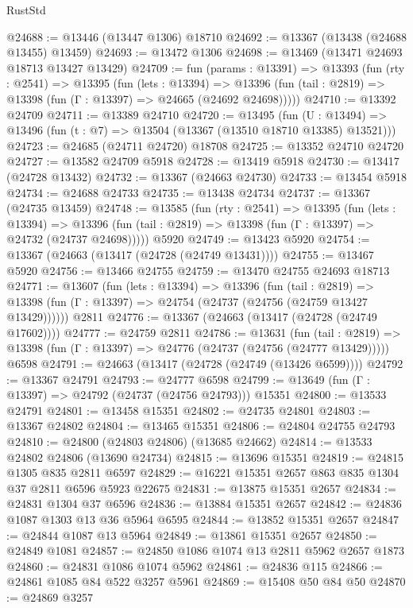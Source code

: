 \begin{lexlean}{RustStd}
\begin{coremodule}
@24688 := @13446 (@13447 @1306) @18710
@24692 := @13367 (@13438 (@24688 @13455) @13459)
@24693 := @13472 @1306
@24698 := @13469 (@13471 @24693 @18713 @13427 @13429)
@24709 := fun (params : @13391) =>
  @13393
    (fun (rty : @2541) =>
    @13395
      (fun (lets : @13394) =>
      @13396 (fun (tail : @2819) => @13398 (fun (Γ : @13397) => @24665 (@24692 @24698)))))
@24710 := @13392 @24709
@24711 := @13389 @24710
@24720 := @13495
    (fun (U : @13494) => @13496 (fun (t : @7) => @13504 (@13367 (@13510 @18710 @13385) @13521)))
@24723 := @24685 (@24711 @24720) @18708
@24725 := @13352 @24710 @24720
@24727 := @13582 @24709 @5918
@24728 := @13419 @5918
@24730 := @13417 (@24728 @13432)
@24732 := @13367 (@24663 @24730)
@24733 := @13454 @5918
@24734 := @24688 @24733
@24735 := @13438 @24734
@24737 := @13367 (@24735 @13459)
@24748 := @13585
    (fun (rty : @2541) =>
    @13395
      (fun (lets : @13394) =>
      @13396 (fun (tail : @2819) => @13398 (fun (Γ : @13397) => @24732 (@24737 @24698)))))
    @5920
@24749 := @13423 @5920
@24754 := @13367 (@24663 (@13417 (@24728 (@24749 @13431))))
@24755 := @13467 @5920
@24756 := @13466 @24755
@24759 := @13470 @24755 @24693 @18713
@24771 := @13607
    (fun (lets : @13394) =>
    @13396
      (fun (tail : @2819) =>
      @13398 (fun (Γ : @13397) => @24754 (@24737 (@24756 (@24759 @13427 @13429))))))
    @2811
@24776 := @13367 (@24663 (@13417 (@24728 (@24749 @17602))))
@24777 := @24759 @2811
@24786 := @13631
    (fun (tail : @2819) => @13398 (fun (Γ : @13397) => @24776 (@24737 (@24756 (@24777 @13429)))))
    @6598
@24791 := @24663 (@13417 (@24728 (@24749 (@13426 @6599))))
@24792 := @13367 @24791
@24793 := @24777 @6598
@24799 := @13649 (fun (Γ : @13397) => @24792 (@24737 (@24756 @24793))) @15351
@24800 := @13533 @24791
@24801 := @13458 @15351
@24802 := @24735 @24801
@24803 := @13367 @24802
@24804 := @13465 @15351
@24806 := @24804 @24755 @24793
@24810 := @24800 (@24803 @24806) (@13685 @24662)
@24814 := @13533 @24802 @24806 (@13690 @24734)
@24815 := @13696 @15351
@24819 := @24815 @1305 @835 @2811 @6597
@24829 := @16221 @15351 @2657 @863 @835 @1304 @37 @2811 @6596 @5923 @22675
@24831 := @13875 @15351 @2657
@24834 := @24831 @1304 @37 @6596
@24836 := @13884 @15351 @2657
@24842 := @24836 @1087 @1303 @13 @36 @5964 @6595
@24844 := @13852 @15351 @2657
@24847 := @24844 @1087 @13 @5964
@24849 := @13861 @15351 @2657
@24850 := @24849 @1081
@24857 := @24850 @1086 @1074 @13 @2811 @5962 @2657 @1873
@24860 := @24831 @1086 @1074 @5962
@24861 := @24836 @115
@24866 := @24861 @1085 @84 @522 @3257 @5961
@24869 := @15408 @50 @84 @50
@24870 := @24869 @3257

\end{coremodule}
\end{lexlean}
